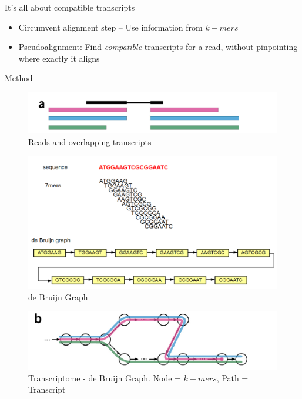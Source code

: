 \documentclass[10pt]{beamer}
\begin{document}
\begin{frame}[fragile]{It's all about compatible transcripts}

\begin{itemize}
\item Circumvent alignment step -- Use information from $k-mers$
\item Pseudoalignment: Find \emph{compatible} transcripts for a read, without pinpointing where exactly it aligns
\end{itemize}

\end{frame}

\begin{frame}[allowframebreaks]{Method}
\begin{figure}
\includegraphics[width=\textwidth]{figa}
\caption{Reads and overlapping transcripts}
\end{figure}

\begin{figure}
\includegraphics[width=\textwidth]{debruijn}
\caption{\footnotesize de Bruijn Graph}
\end{figure}

\begin{figure}
\includegraphics[width=\textwidth]{figb}
\caption{\footnotesize Transcriptome - de Bruijn Graph. Node = $k-mers$, Path = Transcript}
\end{figure}


\end{frame}
\end{document}
